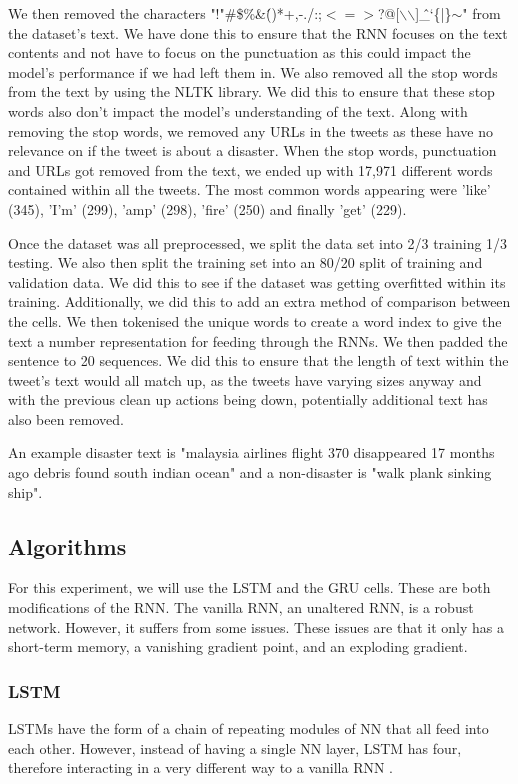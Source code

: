 \documentclass[a4paper,10pt]{article}
\begin{document}
	We then removed the characters "!"\#\$\%\&\'()*+,-./:;$<=>$?@[$\backslash$$\backslash$]\^\_`\{|\}$\sim$" from the dataset's text. We have done this to ensure that the RNN focuses on the text contents and not have to focus on the punctuation as this could impact the model's performance if we had left them in. We also removed all the stop words from the text by using the NLTK library. We did this to ensure that these stop words also don't impact the model's understanding of the text. Along with removing the stop words, we removed any URLs in the tweets as these have no relevance on if the tweet is about a disaster. When the stop words, punctuation and URLs got removed from the text, we ended up with 17,971 different words contained within all the tweets. The most common words appearing were 'like' (345), 'I'm' (299), 'amp' (298), 'fire' (250) and finally 'get' (229).
	
	Once the dataset was all preprocessed, we split the data set into 2/3 training 1/3 testing. We also then split the training set into an 80/20 split of training and validation data. We did this to see if the dataset was getting overfitted within its training. Additionally, we did this to add an extra method of comparison between the cells. We then tokenised the unique words to create a word index to give the text a number representation for feeding through the RNNs. We then padded the sentence to 20 sequences. We did this to ensure that the length of text within the tweet's text would all match up, as the tweets have varying sizes anyway and with the previous clean up actions being down, potentially additional text has also been removed.   
	
	An example disaster text is "malaysia airlines flight 370 disappeared 17 months ago debris found south indian ocean" and a non-disaster is "walk plank sinking ship".

\subsection{Algorithms}
	For this experiment, we will use the LSTM and the GRU cells. These are both modifications of the RNN. The vanilla RNN, an unaltered RNN, is a robust network. However, it suffers from some issues. These issues are that it only has a short-term memory, a vanishing gradient point, and an exploding gradient.
	
	\subsubsection{LSTM}
	LSTMs have the form of a chain of repeating modules of NN that all feed into each other. However, instead of having a single NN layer, LSTM has four, therefore interacting in a very different way to a vanilla RNN \cite{lstm_networks}.
	
\end{document}
